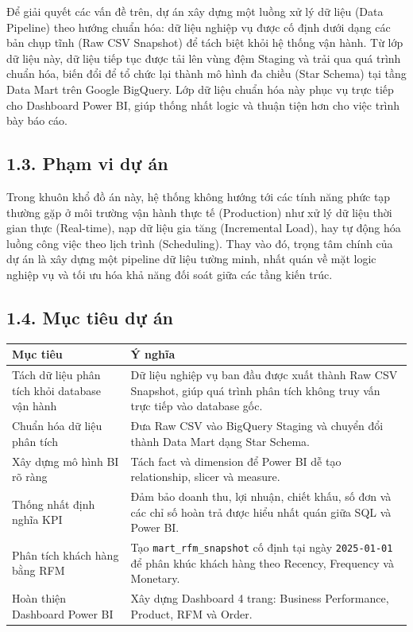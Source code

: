 \documentclass[12pt,a4paper]{article}
\newcommand{\code}[1]{\texttt{#1}}
\begin{document}
Để giải quyết các vấn đề trên, dự án xây dựng một luồng xử lý dữ liệu (Data Pipeline) theo hướng chuẩn hóa: dữ liệu nghiệp vụ được cố định dưới dạng các bản chụp tĩnh (Raw CSV Snapshot) để tách biệt khỏi hệ thống vận hành. Từ lớp dữ liệu này, dữ liệu tiếp tục được tải lên vùng đệm Staging và trải qua quá trình chuẩn hóa, biến đổi để tổ chức lại thành mô hình đa chiều (Star Schema) tại tầng Data Mart trên Google BigQuery. Lớp dữ liệu chuẩn hóa này phục vụ trực tiếp cho Dashboard Power BI, giúp thống nhất logic và thuận tiện hơn cho việc trình bày báo cáo.

\subsection{1.3. Phạm vi dự án}

Trong khuôn khổ đồ án này, hệ thống không hướng tới các tính năng phức tạp thường gặp ở môi trường vận hành thực tế (Production) như xử lý dữ liệu thời gian thực (Real-time), nạp dữ liệu gia tăng (Incremental Load), hay tự động hóa luồng công việc theo lịch trình (Scheduling). Thay vào đó, trọng tâm chính của dự án là xây dựng một pipeline dữ liệu tường minh, nhất quán về mặt logic nghiệp vụ và tối ưu hóa khả năng đối soát giữa các tầng kiến trúc.

\subsection{1.4. Mục tiêu dự án}

\begin{table}[H]
\centering
\begin{tabularx}{\textwidth}{|p{}|Y|}
\hline
\textbf{Mục tiêu} & \textbf{Ý nghĩa} \\
\hline
Tách dữ liệu phân tích khỏi database vận hành & Dữ liệu nghiệp vụ ban đầu được xuất thành Raw CSV Snapshot, giúp quá trình phân tích không truy vấn trực tiếp vào database gốc. \\
\hline
Chuẩn hóa dữ liệu phân tích & Đưa Raw CSV vào BigQuery Staging và chuyển đổi thành Data Mart dạng Star Schema. \\
\hline
Xây dựng mô hình BI rõ ràng & Tách fact và dimension để Power BI dễ tạo relationship, slicer và measure. \\
\hline
Thống nhất định nghĩa KPI & Đảm bảo doanh thu, lợi nhuận, chiết khấu, số đơn và các chỉ số hoàn trả được hiểu nhất quán giữa SQL và Power BI. \\
\hline
Phân tích khách hàng bằng RFM & Tạo \code{mart\_rfm\_snapshot} cố định tại ngày \code{2025-01-01} để phân khúc khách hàng theo Recency, Frequency và Monetary. \\
\hline
Hoàn thiện Dashboard Power BI & Xây dựng Dashboard 4 trang: Business Performance, Product, RFM và Order. \\
\hline
\end{tabularx}
\end{table}
\end{document}
